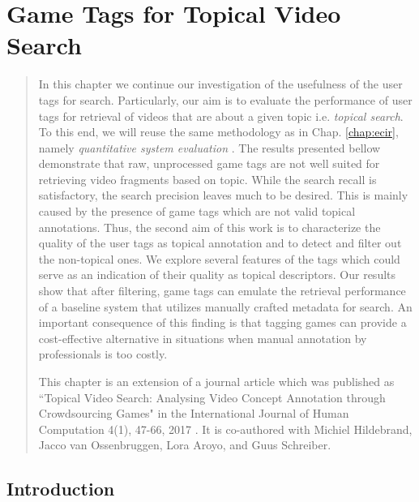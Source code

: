 \chapter{Game Tags for Topical Video Search}\label{chap:topicir-filter}
\begin{quotation}
\noindent
In this chapter we continue our investigation of the usefulness of the user tags for search. Particularly, our aim is to evaluate the performance of user tags for retrieval of videos that are about a given topic i.e. \textit{topical search}. To this end, we will reuse the same methodology as in Chap. \ref{chap:ecir}, namely \textit{quantitative system evaluation} \cite{vorhees}. The results presented bellow demonstrate that raw, unprocessed game tags are not well suited for retrieving video fragments based on topic. While the search recall is satisfactory, the search precision leaves much to be desired. This is mainly caused by the presence of game tags which are not valid topical annotations. Thus, the second aim of this work is to characterize the quality of the user tags as topical annotation and to detect and filter out the non-topical ones. We explore several features of the tags which could serve as an indication of their quality as topical descriptors. Our results show that after filtering, game tags can emulate the retrieval performance of a baseline system that utilizes manually crafted metadata for search. An important consequence of this finding is that tagging games can provide a cost-effective alternative in situations when manual annotation by professionals is too costly.

This chapter is an extension of a journal article which was published as ``Topical Video Search: Analysing Video Concept Annotation through Crowdsourcing Games" in the International Journal of Human Computation 4(1), 47-66, 2017 \cite{hcj-riste}. It is co-authored with Michiel Hildebrand, Jacco van Ossenbruggen, Lora Aroyo, and Guus Schreiber.

\end{quotation}

\section{Introduction}

